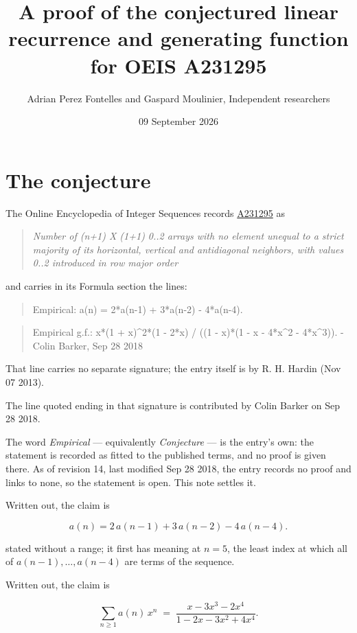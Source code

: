 \documentclass[11pt]{article}
\title{A proof of the conjectured linear recurrence and generating function for OEIS A231295}
\author{Adrian Perez Fontelles and Gaspard Moulinier, Independent researchers}
\date{09 September 2026}
\theoremstyle{definition}
\begin{document}
\maketitle
\section{The conjecture}

The Online Encyclopedia of Integer Sequences records \href{https://oeis.org/A231295}{A231295} as

\begin{quote}\itshape Number of (n+1) X (1+1) 0..2 arrays with no element unequal to a strict majority of its horizontal, vertical and antidiagonal neighbors, with values 0..2 introduced in row major order\end{quote}

and carries in its Formula section the lines:

\begin{quote}\ttfamily Empirical: a(n) = 2*a(n-1) + 3*a(n-2) - 4*a(n-4).\end{quote}

\begin{quote}\ttfamily Empirical g.f.: x*(1 + x)\textasciicircum{}2*(1 - 2*x) / ((1 - x)*(1 - x - 4*x\textasciicircum{}2 - 4*x\textasciicircum{}3)). - Colin Barker, Sep 28 2018\end{quote}

That line carries no separate signature; the entry itself is by R. H. Hardin (Nov 07 2013).

The line quoted ending in that signature is contributed by Colin Barker on Sep 28 2018.

The word {\itshape Empirical} --- equivalently {\itshape Conjecture} --- is the entry's own: the statement is recorded as fitted to the published terms, and no proof is given there. As of revision 14, last modified Sep 28 2018, the entry records no proof and links to none, so the statement is open. This note settles it.

Written out, the claim is

\[a(n) = 2\,a(n-1) + 3\,a(n-2) - 4\,a(n-4).\]

stated without a range; it first has meaning at $n = 5$, the least index at which all of $a(n-1),\dots,a(n-4)$ are terms of the sequence.

Written out, the claim is

\[\sum_{n \ge 1} a(n)\,x^n \;=\; \frac{x - 3x^{3} - 2x^{4}}{1 - 2x - 3x^{2} + 4x^{4}}.\]
\end{document}
